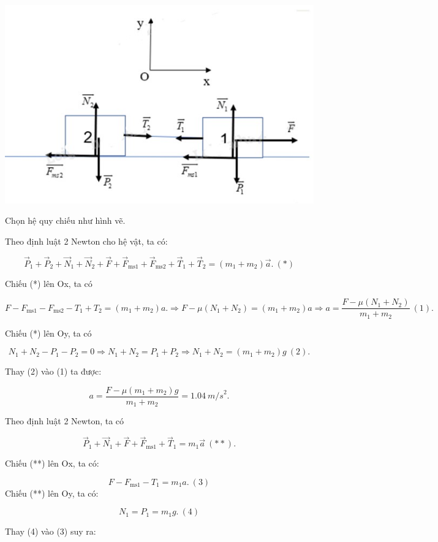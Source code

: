 \begin{enumerate}[label=\bfseries Câu \arabic*:]
	\hideall
	{
		\begin{center}
			\includegraphics[scale=1]{../figs/VN10-2022-PH-TP021-13.jpg}
		\end{center}
	
	
		Chọn hệ quy chiếu như hình vẽ.
		
		Theo định luật 2 Newton cho hệ vật, ta có:
		
		$$\vec P_1 + \vec P_2 + \vec N_1 + \vec N_2 + \vec F + \vec F_\text{ms1} + \vec F_\text{ms2} + \vec T_1 + \vec T_2 = (m_1 + m_2)\vec a.\ (*)$$
		
		Chiếu (*) lên Ox, ta có
		
		$$F - F_\text{ms1} - F_\text{ms2} - T_1 + T_2 = (m_1 + m_2)a. \Rightarrow F - \mu(N_1 + N_2) = (m_1 + m_2)a\Rightarrow a = \dfrac{F - \mu (N_1 + N_2)}{m_1+m_2}\ (1).$$
		
		Chiếu (*) lên Oy, ta có
		
		$$N_1 + N_2 - P_1 - P_2 =0 \Rightarrow N_1 + N_2 = P_1 + P_2 \Rightarrow N_1 + N_2 = (m_1 + m_2)g\ (2).$$
		
		Thay (2) vào (1) ta được:
		
		 $$a = \dfrac{F - \mu (m_1 + m_2)g}{m_1+m_2}= \SI{1,04}{m/s}^2.$$
		
		Theo định luật 2 Newton, ta có
		
		$$\vec P_1 + \vec N_1 + \vec F + \vec F_\text{ms1} + \vec T_1 = m_1 \vec a\ (**).$$
		
		Chiếu (**) lên Ox, ta có:
		
		$$F - F_\text{ms1} - T_1 = m_1a.\ (3)$$
		Chiếu (**) lên Oy, ta có:
		
		$$N_1 = P_1 = m_1g. \ (4)$$
		
		Thay (4) vào (3) suy ra:
		
}
\end{enumerate}
